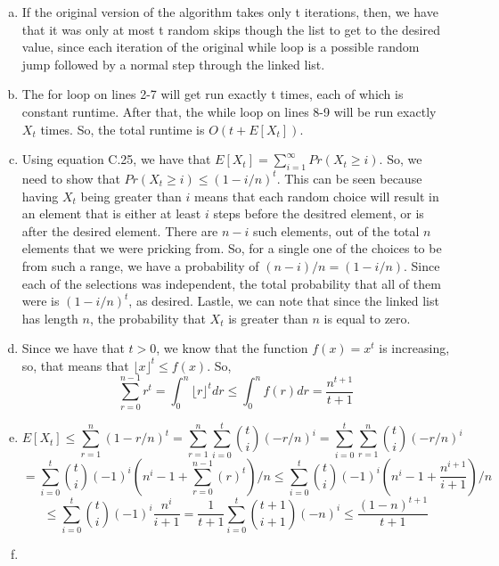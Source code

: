 \documentclass{article}
\begin{document}
\begin{enumerate}[a.]
\item
If the original version of the algorithm takes only t iterations, then, we have that it was only at most t random skips though the list to get to the desired value, since each iteration of the original while loop is a possible random jump followed by a normal step through the linked list.

\item
The for loop on lines 2-7 will get run exactly t times, each of which is constant runtime. After that, the while loop on lines 8-9 will be run exactly $X_t$ times. So, the total runtime is $O(t+E[X_t])$.

\item

Using equation C.25, we have that $E[X_t] = \sum_{i=1}^{\infty} Pr(X_t\ge i)$. So, we need to show that $ Pr(X_t\ge i) \le (1-i/n)^t$. This can be seen because having $X_t$ being greater than $i$ means that each random choice will result in an element that is either at least $i$ steps before the desitred element, or is after the desired element. There are $n-i$ such elements, out of the total $n$ elements that we were pricking from. So, for a single one of the choices to be from such a range, we have a probability of $(n-i)/n = (1-i/n)$. Since each of the selections was independent, the total probability that all of them were is $(1-i/n)^t$, as desired. Lastle, we can note that since the linked list has length $n$, the probability that $X_t$ is greater than $n$ is equal to zero.

\item

Since we have that $t>0$, we know that the function $f(x) = x^t$ is increasing, so, that means that $\lfloor x \rfloor ^t \le f(x)$. So,
\[
\sum_{r=0}^{n-1} r^t  = \int_{0}^n \lfloor r \rfloor^t dr \le \int_0^n f(r) dr = \frac{n^{t+1}}{t+1}
\]

\item

\[
E[X_t] \le \sum_{r=1}^n (1-r/n)^t = \sum_{r=1}^n \sum_{i=0}^t \binom{t}{i} (-r/n)^i = \sum_{i=0}^t \sum_{r=1}^n  \binom{t}{i} (-r/n)^i \]\[
= \sum_{i=0}^t  \binom{t}{i} (-1)^i\left(n^i -1+ \sum_{r=0}^{n-1} (r)^t\right)/n \le \sum_{i=0}^t  \binom{t}{i} (-1)^i\left( n^i-1+ \frac{n^{i+1}}{i+1}\right)/n 
\]
\[
\le  \sum_{i=0}^t  \binom{t}{i} (-1)^i \frac{n^i}{i+1} =  \frac{1}{t+1} \sum_{i=0}^t \binom{t+1}{i+1} (-n)^i \le \frac{(1-n)^{t+1}}{t+1}
\]

\item


\end{enumerate}
\end{document}
